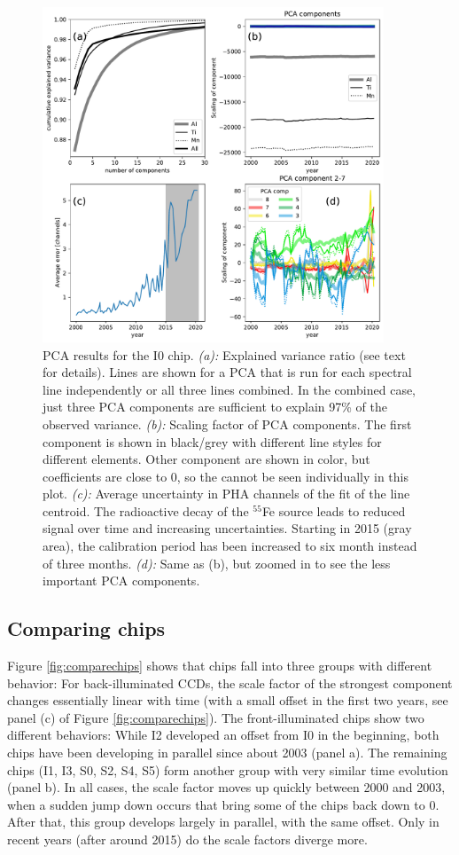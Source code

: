 \documentclass[]{spie}  %
\begin{document}
\begin{figure} [ht]
  \begin{center}
    \includegraphics[height=10cm]{figures/PCA_details_i0.pdf}
  \end{center}
  \caption
      {PCA results for the I0 chip. \emph{(a):} Explained variance ratio (see text for details). Lines are shown for a PCA that is run for each spectral line independently or all three lines combined. In the combined case, just three PCA components are sufficient to explain 97\% of the observed variance. \emph{(b):} Scaling factor of PCA components. The first component is shown in black/grey with different line styles for different elements. Other component are shown in color, but coefficients are close to 0, so the cannot be seen individually in this plot. \emph{(c):} Average uncertainty in PHA channels of the fit of the line centroid. The radioactive decay of the $^{55}$Fe source leads to reduced signal over time and increasing uncertainties. Starting in 2015 (gray area), the calibration period has been increased to six month instead of three months. \emph{(d):} Same as (b), but zoomed in to see the less important PCA components.
      \label{fig:explvar}}
\end{figure}

\subsection{Comparing chips}
Figure \ref{fig:comparechips} shows that chips fall into three groups with different behavior: For back-illuminated CCDs, the scale factor of the strongest component changes essentially linear with time (with a small offset in the first two years, see panel (c) of Figure \ref{fig:comparechips}). The front-illuminated chips show two different behaviors: While I2 developed an offset from I0 in the beginning, both chips have been developing in parallel since about 2003 (panel a). The remaining chips (I1, I3, S0, S2, S4, S5) form another group with very similar time evolution (panel b). In all cases, the scale factor moves up quickly between 2000 and 2003, when a sudden jump down occurs that bring some of the chips back down to 0. After that, this group develops largely in parallel, with the same offset. Only in recent years (after around 2015) do the scale factors diverge more.
\end{document}
